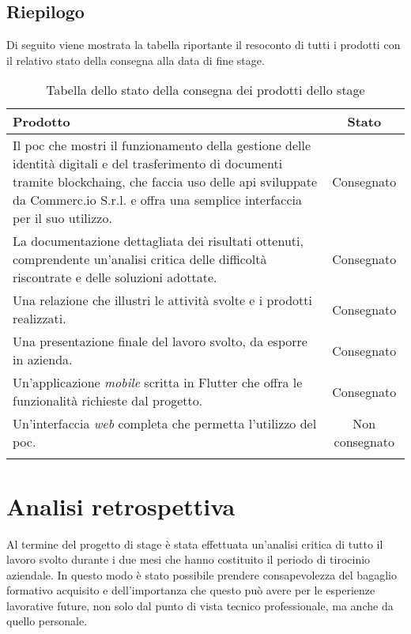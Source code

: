 \subsection{Riepilogo}

Di seguito viene mostrata la tabella riportante il resoconto di tutti i prodotti con il relativo stato della consegna alla data di fine stage.

\begin{longtable}{|p{9.7cm}|c|}
	\hline
	\rowcolor{gray}
	\textbf{Prodotto} & \textbf{Stato} \\\hline
	Il \gls{poc} che mostri il funzionamento della gestione delle identità digitali e del trasferimento di documenti tramite \gls{blockchaing}, che faccia uso delle \gls{api} sviluppate da Commerc.io S.r.l. e offra una semplice interfaccia per il suo utilizzo. & Consegnato \\\hline
	La documentazione dettagliata dei risultati ottenuti, comprendente un'analisi critica delle difficoltà riscontrate e delle soluzioni adottate. & Consegnato \\\hline
	Una relazione che illustri le attività svolte e i prodotti realizzati. & Consegnato \\\hline
	Una presentazione finale del lavoro svolto, da esporre in azienda. & Consegnato \\\hline
	Un'applicazione \textit{mobile} scritta in Flutter che offra le funzionalità richieste dal progetto. & Consegnato \\\hline
	Un'interfaccia \textit{web} completa che permetta l'utilizzo del \gls{poc}. & Non consegnato \\\hline
	
	\caption{Tabella dello stato della consegna dei prodotti dello stage}
	\label{tab:consegna-prodotti}
\end{longtable}

\section{Analisi retrospettiva}

Al termine del progetto di stage è stata effettuata un'analisi critica di tutto il lavoro svolto durante i due mesi che hanno costituito il periodo di tirocinio aziendale. In questo modo è stato possibile prendere consapevolezza del bagaglio formativo acquisito e dell'importanza che questo può avere per le esperienze lavorative future, non solo dal punto di vista tecnico professionale, ma anche da quello personale. 

